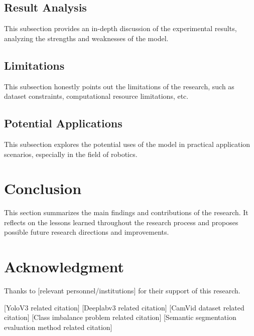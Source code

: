 \documentclass[conference]{IEEEtran}
\begin{document}
\subsection{Result Analysis}
This subsection provides an in-depth discussion of the experimental results, analyzing the strengths and weaknesses of the model.

\subsection{Limitations}
This subsection honestly points out the limitations of the research, such as dataset constraints, computational resource limitations, etc.

\subsection{Potential Applications}
This subsection explores the potential uses of the model in practical application scenarios, especially in the field of robotics.

\section{Conclusion}
This section summarizes the main findings and contributions of the research. It reflects on the lessons learned throughout the research process and proposes possible future research directions and improvements.

\section*{Acknowledgment}
Thanks to [relevant personnel/institutions] for their support of this research.

\begin{thebibliography}{00}
 [YoloV3 related citation]
 [Deeplabv3 related citation]
 [CamVid dataset related citation]
 [Class imbalance problem related citation]
 [Semantic segmentation evaluation method related citation]
\end{thebibliography}
\end{document}
